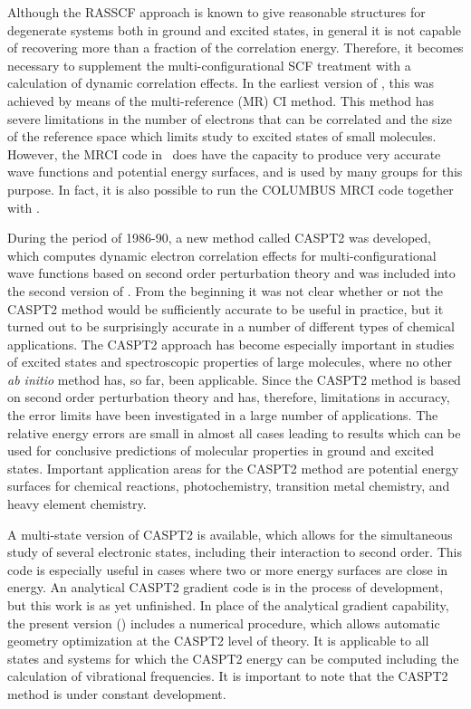 Although the RASSCF approach is known to give reasonable structures for 
degenerate systems both in ground and excited states, in 
general it is not capable of recovering more than a fraction of the correlation 
energy.  Therefore, it becomes  necessary to supplement the multi-configurational SCF 
treatment with a calculation of dynamic correlation effects. In the earliest
version of \molcas, this was achieved by means of the multi-reference (MR) CI 
method. This method has severe limitations in the number of electrons 
that can be correlated and the size of the reference space which limits 
study to excited states of small molecules.
However, the MRCI code in \molcas\ does have the capacity to produce very accurate wave functions and
potential energy surfaces, and is used by many groups for this purpose. 
In fact,  it is also possible to run the COLUMBUS MRCI code together with \molcas.

During the period of 1986-90, a new method called CASPT2 was developed, which 
computes dynamic electron correlation effects for multi-configurational wave 
functions based on second order perturbation theory and was included into the second version of
\molcas. From the beginning it was not clear whether or not the CASPT2 method would be
sufficiently accurate to be useful in practice, but it turned out to be surprisingly 
accurate in a number of different types of chemical applications. 
The CASPT2 approach has become especially important in
studies of excited states and spectroscopic properties of large
molecules, where no other {\em ab initio} method has, so far, been applicable. 
Since the CASPT2 method is based on second order perturbation theory and has, therefore,
limitations in accuracy, the error limits have been investigated in a
large number of applications. The relative energy errors are 
small in almost all cases leading to results which can be used for conclusive
predictions of molecular properties in ground and excited states.
Important application areas for the CASPT2 method are potential energy
surfaces for chemical reactions, photochemistry, transition metal chemistry, and
heavy element chemistry. 

A multi-state version of CASPT2 is available, which allows for the simultaneous 
study of several electronic states, including their interaction to second order. 
This code is especially useful in cases where two or more energy surfaces are 
close in energy.  An analytical CASPT2 gradient code is in the process of development, 
but this work is as yet unfinished. In place of the analytical gradient capability, 
the present version (\molcasversion) includes a numerical procedure, which allows 
automatic geometry optimization at the CASPT2 level of theory. It is applicable 
to all states and systems for which the CASPT2 energy can be computed including the 
calculation of vibrational frequencies.  It is important to note that the CASPT2 
method is under constant development. 

